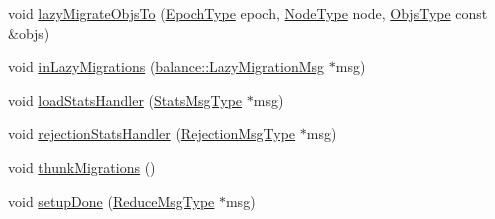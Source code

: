\begin{DoxyCompactItemize}
\item 
void \hyperlink{structvt_1_1vrt_1_1collection_1_1lb_1_1_tempered_l_b_a00af3637cea1d345fea518d2608d5596}{lazy\+Migrate\+Objs\+To} (\hyperlink{namespacevt_a81d11b28122d43bf9834577e4a06440f}{Epoch\+Type} epoch, \hyperlink{namespacevt_a866da9d0efc19c0a1ce79e9e492f47e2}{Node\+Type} node, \hyperlink{structvt_1_1vrt_1_1collection_1_1lb_1_1_tempered_l_b_ad54faf59319f1b33dec689ee853d688e}{Objs\+Type} const \&objs)
\item 
void \hyperlink{structvt_1_1vrt_1_1collection_1_1lb_1_1_tempered_l_b_aa072b3bf3c82899d3228096b60de1647}{in\+Lazy\+Migrations} (\hyperlink{structvt_1_1vrt_1_1collection_1_1balance_1_1_lazy_migration_msg}{balance\+::\+Lazy\+Migration\+Msg} $\ast$msg)
\item 
void \hyperlink{structvt_1_1vrt_1_1collection_1_1lb_1_1_tempered_l_b_a732661a8f887c88514c7435ea628230c}{load\+Stats\+Handler} (\hyperlink{structvt_1_1vrt_1_1collection_1_1lb_1_1_tempered_l_b_a59e5358a716ab79ac33c552cba9033f9}{Stats\+Msg\+Type} $\ast$msg)
\item 
void \hyperlink{structvt_1_1vrt_1_1collection_1_1lb_1_1_tempered_l_b_a356437aa1e6f698f6fb13aad99f0afb0}{rejection\+Stats\+Handler} (\hyperlink{structvt_1_1vrt_1_1collection_1_1lb_1_1_tempered_l_b_af1c8105006c9150e33347c66018e143e}{Rejection\+Msg\+Type} $\ast$msg)
\item 
void \hyperlink{structvt_1_1vrt_1_1collection_1_1lb_1_1_tempered_l_b_ad17685a3f16fd1e56e7db27b6ab702ca}{thunk\+Migrations} ()
\item 
void \hyperlink{structvt_1_1vrt_1_1collection_1_1lb_1_1_tempered_l_b_aace321948834284746579b4e87d60401}{setup\+Done} (\hyperlink{structvt_1_1vrt_1_1collection_1_1lb_1_1_tempered_l_b_a3e688a286b16334d43666bae581231b7}{Reduce\+Msg\+Type} $\ast$msg)
\end{DoxyCompactItemize}
